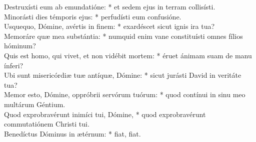 {	Destruxísti eum ab emundatióne: * et sedem ejus in terram collisísti. \\
	Minorásti dies témporis ejus: * perfudísti eum confusióne. \\
	Usquequo, Dómine, avértis in finem: * exardéscet sicut ignis ira tua? \\
	Memoráre quæ mea substántia: * numquid enim vane constituísti omnes fílios hóminum? \\
	Quis est homo, qui vivet, et non vidébit mortem: * éruet ánimam suam de manu ínferi? \\
	Ubi sunt misericórdiæ tuæ antíquæ, Dómine: * sicut jurásti David in veritáte tua? \\
	Memor esto, Dómine, oppróbrii servórum tuórum: * quod contínui in sinu meo multárum Géntium. \\
	Quod exprobravérunt inimíci tui, Dómine, * quod exprobravérunt commutatiónem Christi tui. \\
	Benedíctus Dóminus in ætérnum: * fiat, fiat. \\
}

